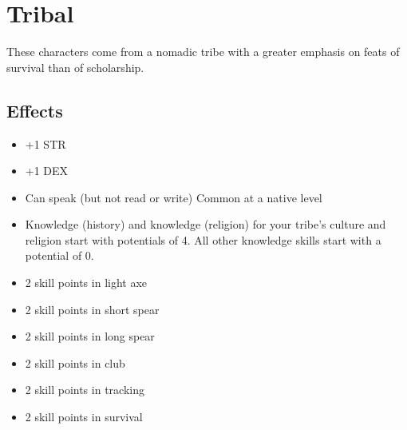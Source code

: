 \section{Tribal}\label{culture:tribal}
These characters come from a nomadic tribe with a greater emphasis on feats of
survival than of scholarship.

\subsection*{Effects}
\begin{itemize}
    \item +1 STR
    \item +1 DEX
    \item Can speak (but not read or write) Common at a native level
    \item Knowledge (history) and knowledge (religion) for your tribe's culture
        and religion start with potentials of 4. All other knowledge skills
        start with a potential of 0.
    \item 2 skill points in light axe
    \item 2 skill points in short spear
    \item 2 skill points in long spear
    \item 2 skill points in club
    \item 2 skill points in tracking
    \item 2 skill points in survival
\end{itemize}
